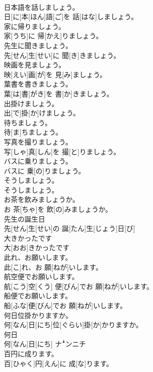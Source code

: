 \documentclass[8pt]{extreport}
\begin{document}
\begin{CJK}{UTF8}{min}
\\	日本語を話しましょう。	
\\	日[に]本[ほん]語[ご]を 話[はな]しましょう。
\\	家に帰りましょう。	
\\	家[うち]に 帰[かえ]りましょう。
\\	先生に聞きましょう。	
\\	先[せん]生[せい]に 聞[き]きましょう。
\\	映画を見ましょう。	
\\	映[えい]画[が]を 見[み]ましょう。
\\	葉書を書きましょう。	
\\	葉[は]書[がき]を 書[か]きましょう。
\\	出掛けましょう。	
\\	出[で]掛[か]けましょう。
\\	待ちましょう。	
\\	待[ま]ちましょう。
\\	写真を撮りましょう。	
\\	写[しゃ]真[しん]を 撮[と]りましょう。
\\	バスに乗りましょう。	
\\	バスに 乗[の]りましょう。
\\	そうしましょう。	
\\	そうしましょう。
\\	お茶を飲みましょうか。	
\\	お 茶[ちゃ]を 飲[の]みましょうか。
\\	先生の誕生日	
\\	先[せん]生[せい]の 誕[たん]生[じょう]日[び]
\\	大きかったです	
\\	大[おお]きかったです
\\	此れ、お願いします。	
\\	此[こ]れ、お 願[ねが]いします。
\\	航空便でお願いします。	
\\	航[こう]空[くう] 便[びん]でお 願[ねが]いします。
\\	船便でお願いします。	
\\	船[ふな]便[びん]でお 願[ねが]いします。
\\	何日位掛かりますか。	
\\	何[なん]日[にち]位[ぐらい]掛[か]かりますか。
\\	何日	
\\	何[なん]日[にち]	ナꜜンニチ
\\	百円に成ります。	
\\	百[ひゃく]円[えん]に 成[な]ります。

\end{CJK}
\end{document}
